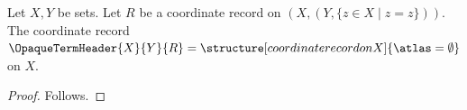 

\begin{construction}\label{opaque_term_header}
    Let $X,Y$ be sets.
    Let $R$ be a coordinate record on
        $(X,(Y,\{z\in X\mid z=z\}))$.
    The coordinate record $\OpaqueTermHeader{X}{Y}{R}=
        \structure[coordinate record on X]{\atlas=\emptyset}$ on $X$.
\end{construction}
\begin{proof}
    Follows.
\end{proof}
